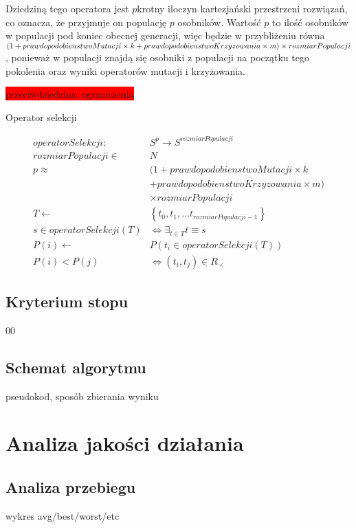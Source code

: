 \documentclass[twoside]{iisthesis}
\newcommand{\todo}{\colorbox{red}}
\begin{document}
Dziedziną tego operatora jest $p$krotny iloczyn kartezjański przestrzeni rozwiązań, co oznacza, że przyjmuje on populację $p$ osobników. Wartość $p$ to ilość osobników w populacji pod koniec obecnej generacji, więc będzie w przybliżeniu równa $(1 + prawdopodobienstwoMutacji \times k + prawdopodobienstwoKrzyzowania \times m) \times \\
rozmiarPopulacji$, ponieważ w populacji znajdą się osobniki z populacji na początku tego pokolenia oraz wyniki operatorów mutacji i krzyżowania. 

\todo{przeciwdziedzina, ograniczenia}

\begin{signature}
	\caption{Operator selekcji \label{signature_selection}}
	\begin{align}
	operatorSelekcji: &S^p \rightarrow S^{rozmiarPopulacji} \\
	rozmiarPopulacji \in &N \\
	p \approx &(1 + prawdopodobienstwoMutacji \times k \\
	          &+ prawdopodobienstwoKrzyzowania \times m) \\
	          &\times rozmiarPopulacji \\
	          T \gets &\left\{ t_0, t_1, \ldots t_{rozmiarPopulacji-1} \right\} \\
	s \in operatorSelekcji(T) &\Leftrightarrow \exists_{t \in T}  t \equiv s \\
	P(i) \gets &P(t_i \in operatorSelekcji(T)) \\
	P(i) < P(j) &\Leftrightarrow (t_i, t_j) \in R_{\prec}
	\end{align}
\end{signature}

\subsection{Kryterium stopu}00
\subsection{Schemat algorytmu}
pseudokod, sposób zbierania wyniku
\section{Analiza jakości działania}
\subsection{Analiza przebiegu}
wykres avg/best/worst/etc
\end{document}
